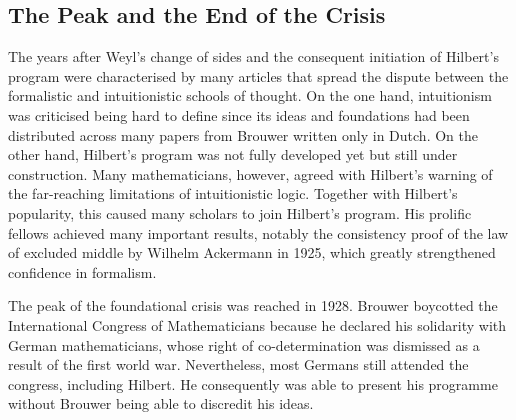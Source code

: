 \documentclass{article}
\begin{document}
\subsection{The Peak and the End of the Crisis}\label{ssec_end_crisis}
The years after Weyl's change of sides and the consequent initiation of Hilbert's program were characterised by many articles that spread the dispute between the formalistic and intuitionistic schools of thought. On the one hand, intuitionism was criticised being hard to define since its ideas and foundations had been distributed across many papers from Brouwer written only in Dutch. On the other hand, Hilbert's program was not fully developed yet but still under construction.
Many mathematicians, however, agreed with Hilbert's warning of the far-reaching limitations of intuitionistic logic. Together with Hilbert's popularity, this caused many scholars to join Hilbert's program. His prolific fellows achieved many important results, notably the consistency proof of the law of excluded middle by Wilhelm Ackermann in 1925, which greatly strengthened confidence in formalism.

The peak of the foundational crisis was reached in 1928. Brouwer boycotted the International Congress of Mathematicians because he declared his solidarity with German mathematicians, whose right of co-determination was dismissed as a result of the first world war. Nevertheless, most Germans still attended the congress, including Hilbert. He consequently was able to present his programme without Brouwer being able to discredit his ideas.
\end{document}
